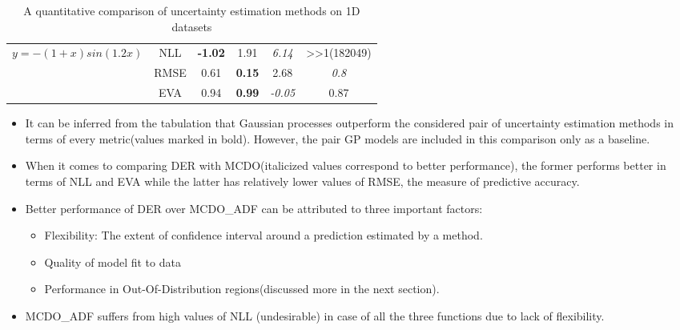 \begin{table}[H]
\begin{tabular}{|c|c|c|c|c|c|}
		\multirow{3}{*}{$y=-(1+x)sin(1.2x)$}                               & NLL             & \textbf{-1.02}                                                      & 1.91                                                                  & \textit{6.14}                & \textgreater{}\textgreater{}1(182049) \\ \cline{2-6} 
		& RMSE            & 0.61                                                                & \textbf{0.15}                                                         & 2.68                & \textit{0.8}                                   \\ \cline{2-6} 
		& EVA             & 0.94                                                                & \textbf{0.99}                                                         & \textit{-0.05}               & 0.87                                  \\ \hline
	\end{tabular}
	\caption{A quantitative comparison of uncertainty estimation methods on 1D datasets}
	\label{tab_quant_compare1D}
\end{table}

\begin{itemize}
	\item It can be inferred from the tabulation that Gaussian processes outperform the considered pair of uncertainty estimation methods in terms of every metric(values marked in bold). However, the pair GP models are included in this comparison only as a baseline.
	\item When it comes to comparing DER with MCDO(italicized values correspond to better performance), the former performs better in terms of NLL and EVA while the latter has relatively lower values of RMSE, the measure of predictive accuracy.
	\item Better performance of DER over MCDO\_ADF can be attributed to three important factors:
	\begin{itemize}
		\item Flexibility: The extent of confidence interval around a prediction estimated by a method.
		\item Quality of model fit to data
		\item Performance in Out-Of-Distribution regions(discussed more in the next section).
	\end{itemize}
	\item MCDO\_ADF suffers from high values of NLL (undesirable) in case of all the three functions due to lack of flexibility.
\end{itemize}
